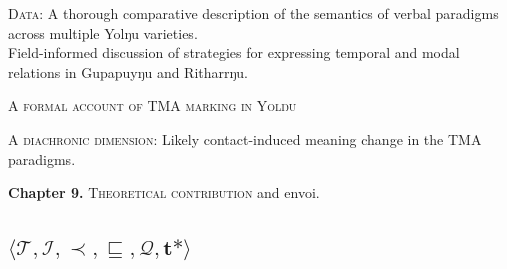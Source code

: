 \documentclass[12pt]{article}
\begin{document}
\begin{description}[labelindent=.8cm]
\item[Chapter 6. ]\textsc{Data:} A thorough comparative description of the semantics of verbal paradigms across multiple Yolŋu varieties.\\Field-informed discussion of strategies for expressing temporal and modal relations in Gupapuyŋu and Ritharrŋu.
\item[Chapter 7. ] \textsc{A formal account of TMA marking in Yolŋu}
\item[Chapter 8. ] \textsc{A diachronic dimension:} Likely contact-induced meaning change in the TMA paradigms.
\end{description}
\textbf{Chapter 9.} \textsc{Theoretical contribution} and envoi.

\subsection{$\boldsymbol{\langle \mathcal{T},\mathcal{I},\prec,\sqsubseteq,\mathcal{Q},t\!*\rangle}$}
\centering
\end{document}
